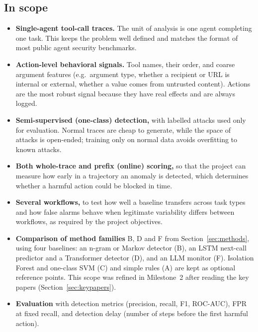 \documentclass[11pt,a4paper]{article}
\begin{document}
\subsection{In scope}
\begin{itemize}
  \item \textbf{Single-agent tool-call traces.} The unit of analysis is one agent completing one task. This keeps the problem well defined and matches the format of most public agent security benchmarks.
  \item \textbf{Action-level behavioral signals.} Tool names, their order, and coarse argument features (e.g.\ argument type, whether a recipient or URL is internal or external, whether a value comes from untrusted content). Actions are the most robust signal because they have real effects and are always logged.
  \item \textbf{Semi-supervised (one-class) detection,} with labelled attacks used only for evaluation. Normal traces are cheap to generate, while the space of attacks is open-ended; training only on normal data avoids overfitting to known attacks.
  \item \textbf{Both whole-trace and prefix (online) scoring,} so that the project can measure how early in a trajectory an anomaly is detected, which determines whether a harmful action could be blocked in time.
  \item \textbf{Several workflows,} to test how well a baseline transfers across task types and how false alarms behave when legitimate variability differs between workflows, as required by the project objectives.
  \item \textbf{Comparison of method families} B, D and F from Section~\ref{sec:methods}, using four baselines: an n-gram or Markov detector (B), an LSTM next-call predictor and a Transformer detector (D), and an LLM monitor (F). Isolation Forest and one-class SVM (C) and simple rules (A) are kept as optional reference points. This scope was refined in Milestone~2 after reading the key papers (Section~\ref{sec:keypapers}).
  \item \textbf{Evaluation} with detection metrics (precision, recall, F1, ROC-AUC), FPR at fixed recall, and detection delay (number of steps before the first harmful action).
\end{itemize}
\end{document}
